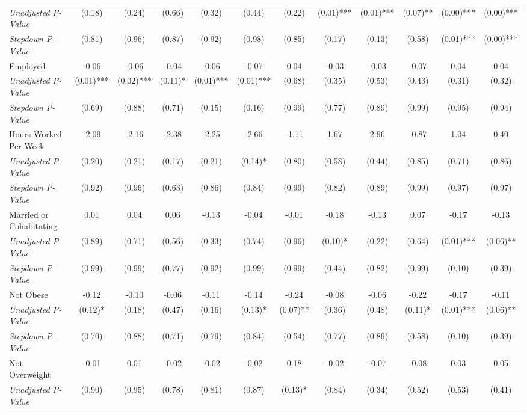 \begin{tabular}{l c c c c c c c c c c c}
\quad \textit{Unadjusted P-Value} & (0.18) & (0.24) & (0.66) & (0.32) & (0.44) & (0.22) & (0.01)*** & (0.01)*** & (0.07)** & (0.00)*** & (0.00)*** \\
\quad \textit{Stepdown P-Value} & (0.81) & (0.96) & (0.87) & (0.92) & (0.98) & (0.85) & (0.17) & (0.13) & (0.58) & (0.01)*** & (0.00)*** \\
Employed & -0.06 & -0.06 & -0.04 & -0.06 & -0.07 & 0.04 & -0.03 & -0.03 & -0.07 & 0.04 & 0.04 \\
\quad \textit{Unadjusted P-Value} & (0.01)*** & (0.02)*** & (0.11)* & (0.01)*** & (0.01)*** & (0.68) & (0.35) & (0.53) & (0.43) & (0.31) & (0.32) \\
\quad \textit{Stepdown P-Value} & (0.69) & (0.88) & (0.71) & (0.15) & (0.16) & (0.99) & (0.77) & (0.89) & (0.99) & (0.95) & (0.94) \\
Hours Worked Per Week & -2.09 & -2.16 & -2.38 & -2.25 & -2.66 & -1.11 & 1.67 & 2.96 & -0.87 & 1.04 & 0.40 \\
\quad \textit{Unadjusted P-Value} & (0.20) & (0.21) & (0.17) & (0.21) & (0.14)* & (0.80) & (0.58) & (0.44) & (0.85) & (0.71) & (0.86) \\
\quad \textit{Stepdown P-Value} & (0.92) & (0.96) & (0.63) & (0.86) & (0.84) & (0.99) & (0.82) & (0.89) & (0.99) & (0.97) & (0.97) \\
Married or Cohabitating & 0.01 & 0.04 & 0.06 & -0.13 & -0.04 & -0.01 & -0.18 & -0.13 & 0.07 & -0.17 & -0.13 \\
\quad \textit{Unadjusted P-Value} & (0.89) & (0.71) & (0.56) & (0.33) & (0.74) & (0.96) & (0.10)* & (0.22) & (0.64) & (0.01)*** & (0.06)** \\
\quad \textit{Stepdown P-Value} & (0.99) & (0.99) & (0.77) & (0.92) & (0.99) & (0.99) & (0.44) & (0.82) & (0.99) & (0.10) & (0.39) \\
Not Obese & -0.12 & -0.10 & -0.06 & -0.11 & -0.14 & -0.24 & -0.08 & -0.06 & -0.22 & -0.17 & -0.11 \\
\quad \textit{Unadjusted P-Value} & (0.12)* & (0.18) & (0.47) & (0.16) & (0.13)* & (0.07)** & (0.36) & (0.48) & (0.11)* & (0.01)*** & (0.06)** \\
\quad \textit{Stepdown P-Value} & (0.70) & (0.88) & (0.71) & (0.79) & (0.84) & (0.54) & (0.77) & (0.89) & (0.58) & (0.10) & (0.39) \\
Not Overweight & -0.01 & 0.01 & -0.02 & -0.02 & -0.02 & 0.18 & -0.02 & -0.07 & -0.08 & 0.03 & 0.05 \\
\quad \textit{Unadjusted P-Value} & (0.90) & (0.95) & (0.78) & (0.81) & (0.87) & (0.13)* & (0.84) & (0.34) & (0.52) & (0.53) & (0.41) \\

\end{tabular}
